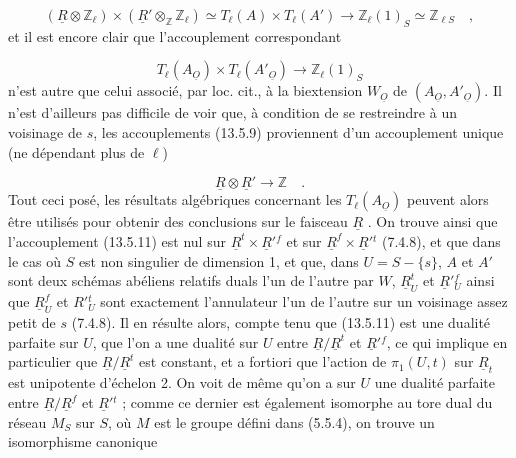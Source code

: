 
\begin{equation}\tag{13.5.9}
(\underline{R}\otimes\mathbb{Z}_\ell) \times (\underline{R}'\otimes_{\mathbb{Z}}\mathbb{Z}_\ell) \simeq T_\ell(A) \times T_\ell(A') \to \mathbb{Z}_\ell(1)_S \simeq \mathbb{Z}_{\ell S} \quad ,
\end{equation}
et il est encore clair que l'accouplement correspondant

\begin{equation}\tag{13.5.10}
T_\ell(A_{\underline{O}}) \times T_\ell(A'_{\underline{O}}) \longrightarrow \mathbb{Z}_\ell(1)_S
\end{equation}
n'est autre que celui associé, par loc. cit., à la biextension $W_{\underline{O}}$ de $(A_{\underline{O}},A'_{\underline{O}})$. Il n'est d'ailleurs pas difficile de voir que, à condition de se restreindre à un voisinage de $s$, les accouplements (13.5.9) proviennent d'un accouplement unique (ne dépendant plus de $\ell$)

\begin{equation}\tag{13.5.11}
\underline{R} \otimes \underline{R}' \longrightarrow \mathbb{Z} \quad .
\end{equation}
Tout ceci posé, les résultats algébriques concernant les $T_\ell(A_{\underline{O}})$ peuvent alors être utilisés pour obtenir des conclusions sur le faisceau $\underline{R}$ . On trouve ainsi que l'accouplement (13.5.11) est nul sur $\underline{R}^{t} \times \underline{R}'{}^{f}$ et sur $\underline{R}^{f} \times \underline{R}'{}^{t}$ (7.4.8), et que dans le cas où $S$ est non singulier de dimension 1, et que, dans $U = S-\{s\}$, $A$ et $A'$ sont deux schémas abéliens relatifs duals l'un de l'autre par $W$, $\underline{R}^{t}_{U}$ et $\underline{R}'{}^{f}_{U}$ ainsi que $\underline{R}^{f}_{U}$ et $R'{}^{t}_{U}$ sont exactement l'annulateur l'un de l'autre sur un voisinage assez petit de $s$ (7.4.8). Il en résulte alors, compte tenu que (13.5.11) est une dualité parfaite sur $U$, que l'on a une dualité sur $U$ entre $\underline{R}/\underline{R}^{t}$ et $\underline{R}'{}^{f}$, ce qui implique en particulier que $\underline{R}/\underline{R}^{t}$ est constant, et a fortiori que l'action de $\pi_1(U,t)$ sur $\underline{R}_t$ est unipotente d'échelon 2. On voit de même qu'on a sur $U$ une dualité parfaite entre $\underline{R}/\underline{R}^{f}$ et $\underline{R}'{}^{t}$ ; comme ce dernier est également isomorphe au tore dual du réseau $M_S$ sur $S$, où $M$ est le groupe défini dans (5.5.4), on trouve un isomorphisme canonique


